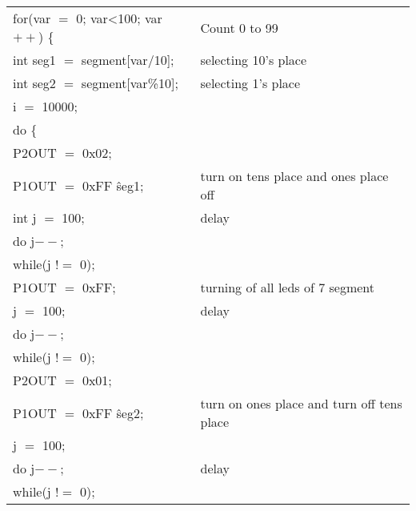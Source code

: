 \documentclass[12pt, letterpaper]{article}
\begin{document}
\begin{longtable}{|p{6cm}||p{5cm}|}
      \hspace{0.3cm}  for(var $=$ 0; var<100; var$++$) \{ & Count 0 to 99\\
        \hspace{0.5cm}    int seg1 $=$ segment[var/10]; & selecting 10's place\\ 
        \hspace{0.5cm}    int seg2 $=$ segment[var\%10]; & selecting 1's place \\
         \hspace{0.5cm}   i $=$ 10000; & \\
         \hspace{0.5cm}   do \{ & \\
            \hspace{0.5cm}    P2OUT $=$ 0x02; & \\
            \hspace{0.5cm}    P1OUT $=$ 0xFF \^ seg1; & turn on tens place and ones place off\\
            \hspace{0.5cm}    int j $=$ 100; &  delay \\
            \hspace{0.5cm}   do j$--$; & \\
            \hspace{0.5cm}    while(j $!=$ 0); & \\
            \hspace{0.5cm}    P1OUT $=$ 0xFF;    & turning of all leds of 7 segment \\
            \hspace{0.5cm}     j $=$ 100; & delay\\
            \hspace{0.5cm}    do j$--$; & \\
            \hspace{0.5cm}    while(j $!=$ 0); & \\
            \hspace{0.5cm}    P2OUT $=$ 0x01; & \\
            \hspace{0.5cm}    P1OUT $=$ 0xFF \^ seg2;     &  turn on ones place and turn off tens place\\
            \hspace{0.5cm}    j $=$ 100; & \\
            \hspace{0.5cm}    do j$--$; &  delay\\
            \hspace{0.5cm}    while(j $!=$ 0); & \\


\end{longtable}
\end{document}
